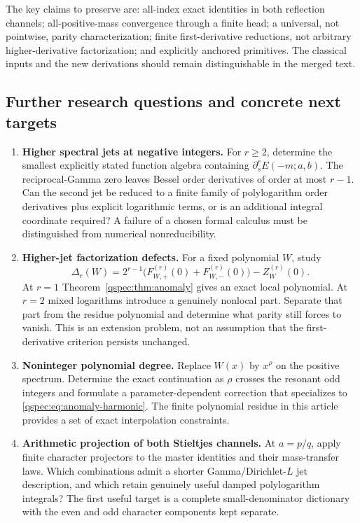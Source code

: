 \documentclass[11pt,letterpaper]{article}
\numberwithin{equation}{section}
\theoremstyle{definition}
\begin{document}
The key claims to preserve are: all-index exact identities in both
reflection channels; all-positive-mass convergence through a finite head;
a universal, not pointwise, parity characterization; finite first-derivative
reductions, not arbitrary higher-derivative factorization; and explicitly
anchored primitives. The classical inputs and the new derivations should
remain distinguishable in the merged text.

\subsection{Further research questions and concrete next targets}
\begin{enumerate}
\item \textbf{Higher spectral jets at negative integers.}
For $r\ge2$, determine the smallest explicitly stated function algebra
containing $\partial_s^rE(-m;a,b)$. The reciprocal-Gamma zero leaves
Bessel order derivatives of order at most $r-1$. Can the second jet be
reduced to a finite family of polylogarithm order derivatives plus
explicit logarithmic terms, or is an additional integral coordinate
required? A failure of a chosen formal calculus must be distinguished
from numerical nonreducibility.

\item \textbf{Higher-jet factorization defects.}
For a fixed polynomial $W$, study
\[
\Delta_r(W)=2^{r-1}\bigl(F_{W,+}^{(r)}(0)+F_{W,-}^{(r)}(0)\bigr)
-Z_W^{(r)}(0).
\]
At $r=1$ Theorem~\ref{qspec:thm:anomaly} gives an exact local polynomial.
At $r=2$ mixed logarithms introduce a genuinely nonlocal part. Separate
that part from the residue polynomial and determine what parity still
forces to vanish. This is an extension problem, not an assumption that
the first-derivative criterion persists unchanged.

\item \textbf{Noninteger polynomial degree.}
Replace $W(x)$ by $x^\rho$ on the positive spectrum. Determine the exact
continuation as $\rho$ crosses the resonant odd integers and formulate a
parameter-dependent correction that specializes to
\eqref{qspec:eq:anomaly-harmonic}. The finite polynomial residue in this
article provides a set of exact interpolation constraints.

\item \textbf{Arithmetic projection of both Stieltjes channels.}
At $a=p/q$, apply finite character projectors to the master identities
and their mass-transfer laws. Which combinations admit a shorter
Gamma/Dirichlet-$L$ jet description, and which retain genuinely useful
damped polylogarithm integrals? The first useful target is a complete
small-denominator dictionary with the even and odd character components
kept separate.


\end{enumerate}
\end{document}

